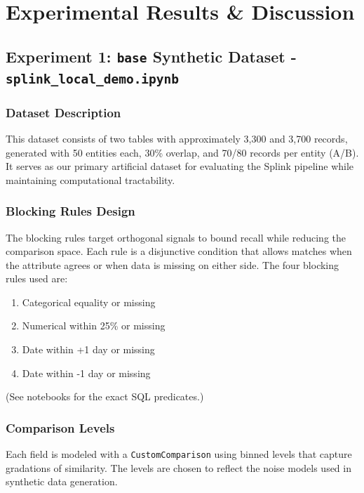 \section{Experimental Results \& Discussion}
\label{sec:results}

\subsection{Experiment 1: \texttt{base} Synthetic Dataset - \texttt{splink\_local\_demo.ipynb}}
\label{sec:exp_smaller}
\subsubsection{Dataset Description}
This dataset consists of two tables with approximately 3,300 and 3,700 records, generated with 50 entities each, 30\% overlap, and 70/80 records per entity (A/B). It serves as our primary artificial dataset for evaluating the Splink pipeline while maintaining computational tractability.
\subsubsection{Blocking Rules Design}
\label{sec:blocking_rules_exp1}
The blocking rules target orthogonal signals to bound recall while reducing the comparison space. Each rule is a disjunctive condition that allows matches when the attribute agrees or when data is missing on either side.
The four blocking rules used are:
\begin{enumerate}
    \item Categorical equality or missing
    \item Numerical within 25\% or missing
    \item Date within +1 day or missing
    \item Date within -1 day or missing
\end{enumerate}
(See notebooks for the exact SQL predicates.)
\subsubsection{Comparison Levels}
\label{sec:comparison_levels_exp1}
Each field is modeled with a \texttt{CustomComparison} using binned levels that capture gradations of similarity. The levels are chosen to reflect the noise models used in synthetic data generation.

